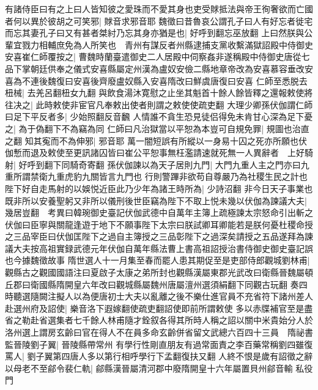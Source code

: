 有諸侍臣曰有之上曰人皆知彼之愛珠而不愛其身也吏受賕抵法與帝王徇奢欲而亡國者何以異於彼胡之可笑邪|{
	賕音求邪音耶}
魏徵曰昔魯哀公謂孔子曰人有好忘者徙宅而忘其妻孔子曰又有甚者桀紂乃忘其身亦猶是也|{
	好呼到翻忘巫放翻}
上曰然朕與公輩宜戮力相輔庶免為人所笑也　青州有謀反者州縣逮捕支黨收繫滿獄詔殿中侍御史安喜崔仁師覆按之|{
	曹魏時蘭臺遣御史二人居殿中伺察姦非遂稱殿中侍御史唐從七品下掌朝廷供奉之儀式安喜縣屬定州漢為盧奴安儉二縣地章帝改為安喜慕容垂改安喜為不連後魏復曰安喜後齊廢盧奴縣入安喜隋改曰鮮虞唐復曰安喜}
仁師至悉脱去杻械|{
	去羌呂翻杻女九翻}
與飲食湯沐寛慰之止坐其魁首十餘人餘皆釋之還報敕使將往决之|{
	此時敕使非宦官凡奉敕出使者則謂之敕使使疏吏翻}
大理少卿孫伏伽謂仁師曰足下平反者多|{
	少始照翻反音飜}
人情誰不貪生恐見徒侣得免未肯甘心深為足下憂之|{
	為于偽翻下不為竊為同}
仁師曰凡治獄當以平恕為本豈可自規免罪|{
	規圖也治直之翻}
知其寃而不為伸邪|{
	邪音耶}
萬一闇短誤有所縱以一身易十囚之死亦所願也伏伽慙而退及敕使至更訊諸囚皆曰崔公平恕事無枉濫請速就死無一人異辭者　上好騎射|{
	好呼到翻下同騎奇寄翻}
孫伏伽諫以為天子居則九門|{
	大門九重人主之門亦曰九重所謂禁衛九重虎豹九關皆言九門也}
行則警蹕非欲苟自尊嚴乃為社稷生民之計也陛下好自走馬射的以娛悦近臣此乃少年為諸王時所為|{
	少詩沼翻}
非今日天子事業也既非所以安養聖躬又非所以儀刑後世臣竊為陛下不取上悦未幾以伏伽為諫議大夫|{
	幾居豈翻　考異曰韓琬御史臺記伏伽武德中自萬年主簿上疏極諫太宗怒命引出斬之伏伽曰臣寧與關龍逢遊于地下不願事陛下太宗曰朕試卿耳卿能若是朕何憂杜稷命授之三品宰臣曰伏伽匡陛下之過自主簿授之三品彰陛下之過深矣請授之五品遂拜為諫議大夫按高祖實録武德元年伏伽自萬年縣法曹上書高祖詔授治書侍御史御史臺記誤也今據魏徵故事}
隋世選人十一月集至春而罷人患其期促至是吏部侍郎觀城劉林甫|{
	觀縣古之觀國國語注曰夏啟子太康之弟所封也觀縣漢屬東郡光武改曰衛縣晉魏屬頓丘郡曰衛國縣隋開皇六年改曰觀城縣屬魏州唐屬澶州選須絹翻下同觀古玩翻}
奏四時聽選隨闕注擬人以為便唐初士大夫以亂離之後不樂仕進官員不充省符下諸州差人赴選州府及詔使|{
	樂音洛下遐嫁翻使疏吏翻詔使即前所謂敕使}
多以赤牒補官至是盡省之勒赴省選集者七千餘人林甫隨才銓叙各得其所時人稱之詔以關中米貴始分人於洛州選上謂房玄齡曰官在得人不在員多命玄齡併省留文武總六百四十三員　隋祕書監晉陵劉子翼|{
	晉陵縣帶常州}
有學行性剛直朋友有過常面責之李百藥常稱劉四雖復罵人|{
	劉子翼第四唐人多以第行相呼學行下孟翻復扶又翻}
人終不恨是歲有詔徵之辭以母老不至鄃令裴仁軌|{
	鄃縣漢晉屬清河郡中廢隋開皇十六年屬置貝州鄃音輸}
私役門

